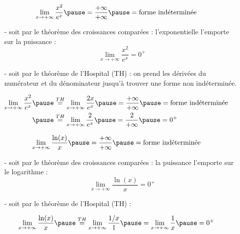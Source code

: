 \documentclass[9pt,handout,professionalfonts,hyperref]{beamer}
\begin{document}
\begin{frame}
$$\lim_{x \to +\infty} \dfrac{x^2}{e^x}\pause =\dfrac{+\infty}{+\infty} \pause = \text{forme indéterminée}$$

\medskip
\begin{itemize}
\pause 	\item[-] soit par le théorème des croissances comparées : \pause l'exponentielle l'emporte sur la puissance : $$\lim_{x \to +\infty} \dfrac{x^2}{e^x}=0^+$$ \newline 
\pause 	\item[-] soit par le théorème de l'Hospital (TH) : \pause on prend les dérivées du numérateur et du dénominateur jusqu'à trouver une forme non indéterminée. 
\end{itemize}

\[\begin{aligned}
\lim_{x \to +\infty} \dfrac{x^2}{e^x} 
\pause &\overset{TH}{=}\lim_{x \to +\infty} \dfrac{2x}{e^x} \pause = \dfrac{+\infty}{+\infty} \pause = \text{forme indéterminée}\\
\pause &\overset{TH}{=} \lim_{x \to +\infty} \dfrac{2}{e^x} \pause = \dfrac{2}{+\infty} \pause =0^+
\end{aligned}\]
\end{frame}

\begin{frame}
$$\lim_{x \to +\infty} \dfrac{\ln(x)}{x}\pause =\dfrac{+\infty}{+\infty}\pause = \text{forme indéterminée}$$

\medskip
\begin{itemize}
\pause 	\item[-] soit par le théorème des croissances comparées : \pause la puissance l'emporte sur le logarithme : $$\lim_{x \to +\infty} \dfrac{\ln(x)}{x}=0^+$$ \newline

\pause 	\item[-] soit par le théorème de l'Hospital (TH) :  
\end{itemize}

\[\begin{aligned}
\lim_{x \to +\infty} \dfrac{\ln(x)}{x} \pause \overset{TH}{=} \lim_{x \to +\infty}\dfrac{1/x}{1}\pause =\lim_{x \to +\infty}\dfrac{1}{x}\pause =0^+
\end{aligned}\]

\end{frame}
\end{document}
